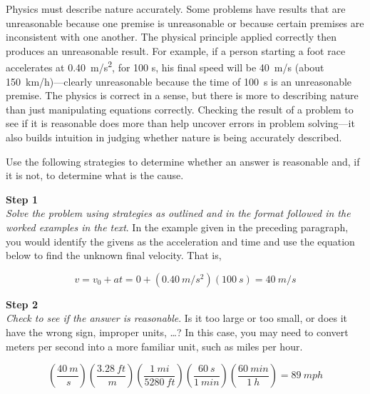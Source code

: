 \documentclass[../../main-ap-physics.tex]{subfiles}
\begin{document}
Physics must describe nature accurately. Some problems have results that are unreasonable because one premise is unreasonable or because certain premises are inconsistent with one another. The physical principle applied correctly then produces an unreasonable result. For example, if a person starting a foot race accelerates at \SI{0.40}{m/s^2}, for 100 s, his final speed will be \SI{40}{m/s} (about \SI{150}{km/h})---clearly unreasonable because the time of \SI{100}{s} is an unreasonable premise. The physics is correct in a sense, but there is more to describing nature than just manipulating equations correctly. Checking the result of a problem to see if it is reasonable does more than help uncover errors in problem solving---it also builds intuition in judging whether nature is being accurately described.

\vspace{1em}

Use the following strategies to determine whether an answer is reasonable and, if it is not, to determine what is the cause.

\vspace{1em}

\textbf{Step 1}\\
\textit{Solve the problem using strategies as outlined and in the format followed in the worked examples in the text}. In the example given in the preceding paragraph, you would identify the givens as the acceleration and time and use the equation below to find the unknown final velocity. That is,

\begin{equation*}
    v = v_0 + at = 0 + \left(\SI{0.40}{m/s^2}\right) \left(\SI{100}{s}\right) = \SI{40}{m/s}
\end{equation*}

\textbf{Step 2}\\
\textit{Check to see if the answer is reasonable}. Is it too large or too small, or does it have the wrong sign, improper units, \ldots ? In this case, you may need to convert meters per second into a more familiar unit, such as miles per hour.

\begin{equation*}
    \left(\frac{\SI{40}{m}}{\SI{}{s}}\right)
    \left(\frac{\SI{3.28}{ft}}{\SI{}{m}}\right)
    \left(\frac{\SI{1}{mi}}{\SI{5280}{ft}}\right)
    \left(\frac{\SI{60}{s}}{\SI{1}{min}}\right)
    \left(\frac{\SI{60}{min}}{\SI{1}{h}}\right)
    = \SI{89}{mph}
\end{equation*}
\end{document}
